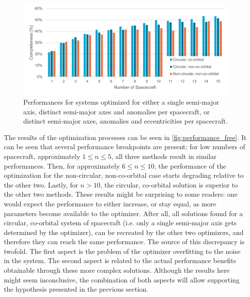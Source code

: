 \begin{figure}[htbp]
 \centering
 \includegraphics[width=1.0\textwidth]{img/performance_free.pdf}
 \caption{Performances for systems optimized for either a single semi-major axis, distinct semi-major axes and anomalies per spacecraft, or distinct semi-major axes, anomalies and eccentricities per spacecraft.}
 \label{fig:performance_free}
\end{figure}

The results of the optimization processes can be seen in \autoref{fig:performance_free}. It can be seen that several performance breakpoints are present: for low numbers of spacecraft, approximately $1 \leq n \leq 5$, all three methods result in similar performances. Then, for approximately $6 \leq n \leq 10$, the performance of the optimization for the non-circular, non-co-orbital case starts degrading relative to the other two. Lastly, for $n > 10$, the circular, co-orbital solution is superior to the other two methods. These results might be surprising to some readers: one would expect the performance to either increase, or stay equal, as more parameters become available to the optimizer. After all, all solutions found for a circular, co-orbital system of spacecraft (i.e. only a single semi-major axis gets determined by the optimizer), can be recreated by the other two optimizers, and therefore they can reach the same performance. The source of this discrepancy is twofold. The first aspect is the problem of the optimizer overfitting to the noise in the system. The second aspect is related to the actual performance benefits obtainable through these more complex solutions. Although the results here might seem inconclusive, the combination of both aspects will allow supporting the hypothesis presented in the previous section.\\

